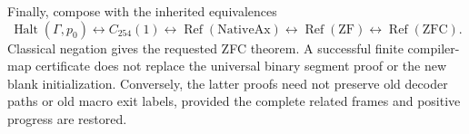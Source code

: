 Finally, compose with the inherited equivalences
\[
 \operatorname{Halt}(\Gamma,p_0)
 \longleftrightarrow C_{254}(1)
 \longleftrightarrow\operatorname{Ref}(\mathrm{NativeAx})
 \longleftrightarrow\operatorname{Ref}(\mathrm{ZF})
 \longleftrightarrow\operatorname{Ref}(\mathrm{ZFC}).
\]
Classical negation gives the requested ZFC theorem.  A successful
finite compiler-map certificate does not replace the universal binary
segment proof or the new blank initialization.  Conversely, the latter
proofs need not preserve old decoder paths or old macro exit labels,
provided the complete related frames and positive progress are restored.
